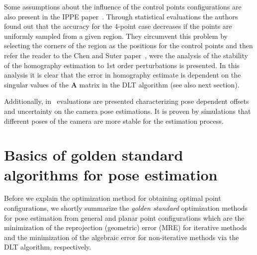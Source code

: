 \documentclass[letterpaper, 10 pt, conference]{ieeeconf}  %
\begin{document}
	
	Some assumptions about the influence of the control points configurations are also present in the IPPE paper~\cite{Collins2014}. Through statistical evaluations the authors found out that the accuracy for the 4-point case decreases if the points are uniformly sampled from a given region.  They circumvent this problem by selecting the corners of the region as the positions for the control points and then refer the reader to the Chen and Suter paper~\cite{Chen2009}, were the analysis of the stability of the homography estimation to 1st order perturbations is presented. In this analysis it is clear that the error in homography estimate is dependent on the singular values of the $\mathbf{A}$ matrix in the DLT algorithm (see also next section).
	
	Additionally, in~\cite{Willert2010, Chung2014} 
	evaluations are presented characterizing pose dependent offsets and uncertainty on the camera pose estimations. It is proven by simulations that different poses of the camera are more stable for the estimation process.
	
	
	
	
	
	
	
	
	\section{Basics of golden standard algorithms for pose estimation}
	\label{SecBasics}
	
	Before we explain the optimization method for obtaining optimal point configurations, we shortly summarize the \textit{golden standard} optimization methods for
	pose estimation from general and planar point configurations which are the minimization of the reprojection (geometric) error (MRE) for iterative methods and the minimization of the algebraic error for non-iterative methods via the DLT algorithm, respectively. 
	
\end{document}
